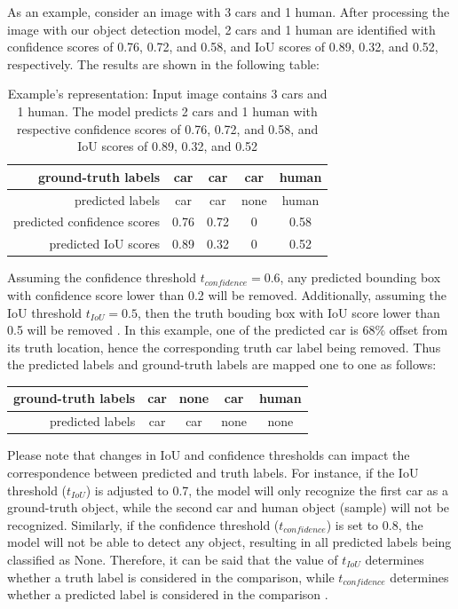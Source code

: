 As an example, consider an image with 3 cars and 1 human. After processing the image with our object detection model, 2 cars and 1 human are identified with confidence scores of 0.76, 0.72, and 0.58, and IoU scores of 0.89, 0.32, and 0.52, respectively. The results are shown in the following table:
\begin{table}[H]
    \centering
    \begin{tabular}{rcccc}
        ground-truth labels         & car  & car  & car  & human \\ \hline
        predicted labels            & car  & car  & none & human \\ \hline
        predicted confidence scores & 0.76 & 0.72 & 0    & 0.58  \\ \hline
        predicted IoU scores        & 0.89 & 0.32 & 0    & 0.52 
    \end{tabular}
    \caption{Example's representation: Input image contains 3 cars and 1 human. The model predicts 2 cars and 1 human with respective confidence scores of 0.76, 0.72, and 0.58, and IoU scores of 0.89, 0.32, and 0.52} \label{ex:truth_pred_score_map}
\end{table}

Assuming the confidence threshold $t_{confidence}=0.6$, any predicted bounding box with confidence score lower than 0.2 will be removed. Additionally, assuming the IoU threshold $t_{IoU}=0.5$, then the truth bouding box with IoU score lower than 0.5 will be removed \cite{metrics_survey_2020}. In this example, one of the predicted car is 68\% offset from its truth location, hence the corresponding truth car label being removed. Thus the predicted labels and ground-truth labels are mapped one to one as follows:
\begin{table}[H]
    \centering
    \begin{tabular}{rcccc}
    ground-truth labels         & car  & none & car  & human \\ \hline
    predicted labels            & car  & car  & none & none
    \end{tabular}
\end{table}

\noindent Please note that changes in IoU and confidence thresholds can impact the correspondence between predicted and truth labels. For instance, if the IoU threshold ($t_{IoU}$) is adjusted to 0.7, the model will only recognize the first car as a ground-truth object, while the second car and human object (sample) will not be recognized. Similarly, if the confidence threshold ($t_{confidence}$) is set to 0.8, the model will not be able to detect any object, resulting in all predicted labels being classified as None. Therefore, it can be said that the value of $t_{IoU}$ determines whether a truth label is considered in the comparison, while $t_{confidence}$ determines whether a predicted label is considered in the comparison \cite{metrics_survey_2020}.

